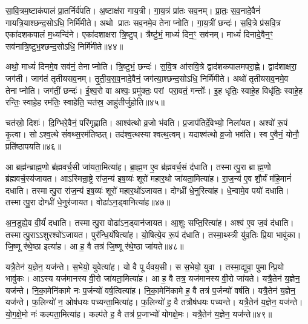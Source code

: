 सा॒वि॒त्रम॒ष्टाक॑पालं प्रा॒तर्निर्व॑पति।
अ॒ष्टाक्ष॑रा गाय॒त्री।
गा॒य॒त्रं प्रा॑तः सव॒नम्।
प्रा॒तः॒ स॒व॒नादे॒वैनं॑ गायत्रि॒याश्छन्द॒सोऽधि॒ निर्मि॑मीते।
अथो प्रातः सव॒नमे॒व तेनाप्नोति।
गा॒य॒त्रीं छन्दः॑।
स॒वि॒त्रे प्र॑सवि॒त्र एका॑दशकपालं म॒ध्यन्दि॑ने।
एका॑दशाक्षरा त्रि॒ष्टुप्।
त्रैष्टु॑भं॒ माध्यं॑ दिन॒ꣳ॒ सव॑नम्।
माध्यं॑ दिनादे॒वैन॒ꣳ॒ सव॑नात्रि॒ष्टुभ॒श्छन्द॒सोऽधि॒ निर्मि॑मीते॥४४॥

अथो॒ माध्यं॑ दिनमे॒व सव॑नं॒ तेनाप्नोति।
त्रि॒ष्टुभं॒ छन्दः॑।
स॒वि॒त्र आ॑सवि॒त्रे द्वाद॑शकपालमपरा॒ह्णे।
द्वाद॑शाक्षरा॒ जग॑ती।
जाग॑तं तृतीयसव॒नम्।
तृ॒ती॒य॒स॒व॒नादे॒वैनं॒ जग॑त्या॒श्छन्द॒सोऽधि॒ निर्मि॑मीते।
अथो॑ तृतीयसव॒नमे॒व तेनाप्नोति।
जग॑तीं॒ छन्दः॑।
ई॒श्व॒रो वा अश्वः॒ प्रमु॑क्तः॒ परां परा॒वतं॒ गन्तोः᳚।
इ॒ह धृतिः॒ स्वाहे॒ह विधृ॑तिः॒ स्वाहे॒ह रन्तिः॒ स्वाहे॒ह रम॑तिः॒ स्वाहेति॒ चत॑स्र॒ आहु॑तीर्जुहोति॥४५॥

चत॑स्रो॒ दिशः॑।
दि॒ग्भिरे॒वैनं॒ परि॑गृह्णाति।
आश्व॑त्थो व्र॒जो भ॑वति।
प्र॒जाप॑तिर्दे॒वेभ्यो॒ निला॑यत।
अश्वो॑ रू॒पं कृ॒त्वा।
सोऽश्व॒त्थे सं॑वथ्स॒रम॑तिष्ठत्।
तद॑श्व॒त्थस्याश्वत्थ॒त्वम्।
यदाश्व॑त्थो व्र॒जो भव॑ति।
स्व ए॒वैनं॒ योनौ॒ प्रति॑ष्ठापयति॥४६॥\anuvakamend[त्रि॒ष्टुभ॒श्छन्द॒सोऽधि॒ निर्मि॑मीते जुहोति॒ नव॑ च]

आ ब्रह्म॑न्ब्राह्म॒णो ब्र॑ह्मवर्च॒सी जा॑यता॒मित्या॑ह।
ब्रा॒ह्म॒ण ए॒व ब्र॑ह्मवर्च॒सं द॑धाति।
तस्मात्पु॒रा ब्राह्म॒णो ब्र॑ह्मवर्च॒स्य॑जायत।
आऽस्मिन्रा॒ष्ट्रे रा॑ज॒न्य॑ इष॒व्यः॑ शूरो॑ महार॒थो जा॑यता॒मित्या॑ह।
रा॒ज॒न्य॑ ए॒व शौ॒र्यं म॑हि॒मानं॑ दधाति।
तस्मात्पु॒रा रा॑ज॒न्य॑ इष॒व्यः॑ शूरो॑ महार॒थो॑\-ऽजायत।
दोग्ध्री॑ धे॒नुरित्या॑ह।
धे॒न्वामे॒व पयो॑ दधाति।
तस्मात्पु॒रा दोग्ध्री॑ धे॒नुर॑जायत।
वोढा॑\-ऽन॒ड्वानित्या॑ह॥४७॥

अ॒न॒डुह्ये॒व वी॒र्यं॑ दधाति।
तस्मात्पु॒रा वोढा॑\-ऽन॒ड्वान॑जायत।
आ॒शुः सप्ति॒रित्या॑ह।
अश्व॑ ए॒व ज॒वं द॑धाति।
तस्मात्पु॒रा\-ऽऽशुरश्वो॑\-ऽजायत।
पुर॑न्धि॒र्योषेत्या॑ह।
यो॒षित्ये॒व रू॒पं द॑धाति।
तस्मा॒थ्स्त्री यु॑व॒तिः प्रि॒या भावु॑का।
जि॒ष्णू र॑थे॒ष्ठा इत्या॑ह।
आ ह॒ वै तत्र॑ जि॒ष्णू र॑थे॒ष्ठा जा॑यते॥४८॥

यत्रै॒तेन॑ य॒ज्ञेन॒ यज॑न्ते।
स॒भेयो॒ युवेत्या॑ह।
यो वै पूर्ववय॒सी।
स स॒भेयो॒ युवा।
तस्मा॒द्युवा॒ पुमान्प्रि॒यो भावु॑कः।
आऽस्य यज॑मानस्य वी॒रो जा॑यता॒मित्या॑ह।
आ ह॒ वै तत्र॒ यज॑मानस्य वी॒रो जा॑यते।
यत्रै॒तेन॑ य॒ज्ञेन॒ यज॑न्ते।
नि॒का॒मेनि॑कामे नः प॒र्जन्यो॑ वर्\mbox{}ष॒त्वित्या॑ह।
नि॒का॒मेनि॑कामे ह॒ वै तत्र॑ प॒र्जन्यो॑ वर्\mbox{}षति।
यत्रै॒तेन॑ य॒ज्ञेन॒ यज॑न्ते।
फ॒लिन्यो॑ न॒ ओष॑धयः पच्यन्ता॒मित्या॑ह।
फ॒लिन्यो॑ ह॒ वै तत्रौष॑धयः पच्यन्ते।
यत्रै॒तेन॑ य॒ज्ञेन॒ यज॑न्ते।
यो॒ग॒क्षे॒मो नः॑ कल्पता॒मित्या॑ह।
कल्प॑ते ह॒ वै तत्र॑ प्र॒जाभ्यो॑ योगक्षे॒मः।
यत्रै॒तेन॑ य॒ज्ञेन॒ यज॑न्ते॥४९॥\anuvakamend[अ॒न॒ड्वानित्या॑ह जायते वर्‌\mbox{}षति स॒प्त च॑]

